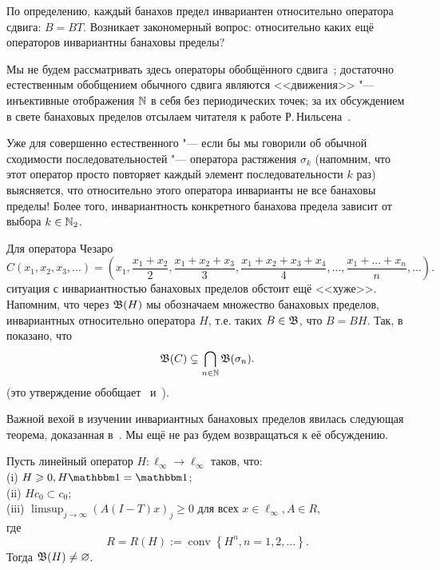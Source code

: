 По определению, каждый банахов предел инвариантен относительно оператора сдвига: $B=BT$.
Возникает закономерный вопрос: относительно каких ещё операторов инвариантны банаховы пределы?

Мы не будем рассматривать здесь операторы обобщённого сдвига~\cite{marchenko2006generalized,lewitan1945normed};
достаточно естественным обобщением обычного сдвига являются <<движения>> "--- инъективные отображения $\mathbb{N}$ в себя без периодических точек; за их обсуждением в свете банаховых пределов отсылаем читателя к работе Р.\,Нильсена~\cite{Nillsen}.

Уже для совершенно естественного "--- если бы мы говорили об обычной сходимости последовательностей "---
оператора растяжения $\sigma_k$
(напомним, что этот оператор просто повторяет каждый элемент последовательности $k$ раз)
выясняется, что относительно этого оператора инварианты не все банаховы пределы!
Более того, инвариантность конкретного банахова предела зависит от выбора $k\in\mathbb{N}_2$.

Для оператора Чезаро
\begin{equation}
	C (x_1, x_2, x_3, ...) = \left(
	x_1,
	\dfrac{x_1+x_2}2,
	\dfrac{x_1+x_2 + x_3}3,
	\dfrac{x_1+x_2+x_3+x_4}4,
	...,
	\dfrac{x_1+...+x_n}n,
	...\right)
	.
\end{equation}
ситуация с инвариантностью банаховых пределов обстоит ещё <<хуже>>.
Напомним, что через $\mathfrak{B}(H)$ мы обозначаем множество банаховых пределов,
инвариантных относительно оператора $H$,
т.е. таких $B\in \mathfrak{B}$, что $B=BH$.
Так, в~\cite[\S2, теорема 4]{semenov2020dilation} показано, что
\begin{equation}
	\label{eq:B_C_subsetneq_B_sigma_n}
	\B(C) \subsetneq \bigcap_{n\in \N}\B(\sigma_n)
	.
\end{equation}
(это утверждение обобщает~\cite[теорема 3]{semenov2020invariant_noncommutative}
и~\cite[теорема 4.8]{ASSU4}).

Важной вехой в изучении инвариантных банаховых пределов явилась следующая теорема,
доказанная в~\cite[\S2]{Semenov2010invariant}.
Мы ещё не раз будем возвращаться к её обсуждению.

\begin{theorem}
	\label{thm:Semenov_Sukochev_conditions}
	Пусть линейный оператор $H:\ell_\infty\to\ell_\infty$ таков, что:
	\\(i)   $H \geqslant 0, H \one=\one$;
	\\(ii)  $H c_0 \subset c_0$;
	\\(iii) $\limsup _{j \rightarrow \infty}(A(I-T) x)_j \geqslant 0$ для всех $x \in \ell_{\infty}, A \in R$,
	\\где
	\begin{equation}
		R=R(H):=\operatorname{conv}\left\{H^n, n=1,2, \ldots\right\}
		.
	\end{equation}
	Тогда $\mathfrak{B}(H) \ne\varnothing$.
\end{theorem}

